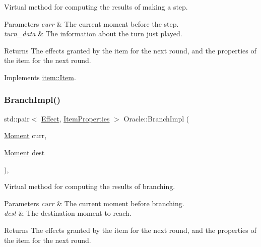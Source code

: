 Virtual method for computing the results of making a step. 


\begin{DoxyParams}{Parameters}
{\em curr} & The current moment before the step. \\
\hline
{\em turn\+\_\+data} & The information about the turn just played. \\
\hline
\end{DoxyParams}
\begin{DoxyReturn}{Returns}
The effects granted by the item for the next round, and the properties of the item for the next round. 
\end{DoxyReturn}


Implements \hyperlink{classitem_1_1_item_a90df61c8a2a20144eb1100af5fb2d464}{item\+::\+Item}.

\mbox{\label{classitem_1_1_oracle_a9a8911eef902d4dcca95f111fda7c5d0}} 
\subsubsection{\texorpdfstring{Branch\+Impl()}{BranchImpl()}}
{\footnotesize\ttfamily std\+::pair$<$ \hyperlink{classitem_1_1_effect}{Effect}, \hyperlink{classitem_1_1_item_properties}{Item\+Properties} $>$ Oracle\+::\+Branch\+Impl (\begin{DoxyParamCaption}\item[{\hyperlink{classtimeplane_1_1_moment}{Moment}}]{curr,  }\item[{\hyperlink{classtimeplane_1_1_moment}{Moment}}]{dest }\end{DoxyParamCaption})\hspace{0.3cm}{\ttfamily [protected]}, {\ttfamily [virtual]}}



Virtual method for computing the results of branching. 


\begin{DoxyParams}{Parameters}
{\em curr} & The current moment before branching. \\
\hline
{\em dest} & The destination moment to reach. \\
\hline
\end{DoxyParams}
\begin{DoxyReturn}{Returns}
The effects granted by the item for the next round, and the properties of the item for the next round. 
\end{DoxyReturn}


